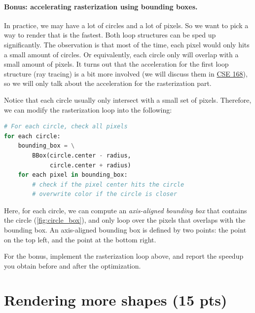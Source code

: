 \paragraph{Bonus: accelerating rasterization using bounding boxes.} In practice, we may have a lot of circles and a lot of pixels. So we want to pick a way to render that is the fastest. Both loop structures can be sped up significantly. The observation is that most of the time, each pixel would only hits a small amount of circles. Or equivalently, each circle only will overlap with a small amount of pixels. It turns out that the acceleration for the first loop structure (ray tracing) is a bit more involved (we will discuss them in \href{https://cseweb.ucsd.edu/~tzli/cse168}{CSE 168}), so we will only talk about the acceleration for the rasterization part.

Notice that each circle usually only intersect with a small set of pixels. Therefore, we can modify the rasterization loop into the following:
\begin{lstlisting}[language=Python]
# For each circle, check all pixels
for each circle:
    bounding_box = \
        BBox(circle.center - radius,
             circle.center + radius)
    for each pixel in bounding_box:
        # check if the pixel center hits the circle
        # overwrite color if the circle is closer
\end{lstlisting}
Here, for each circle, we can compute an \emph{axis-aligned bounding box} that contains the circle (\cref{fig:circle_box}), and only loop over the pixels that overlaps with the bounding box. An axis-aligned bounding box is defined by two points: the point on the top left, and the point at the bottom right. 

For the bonus, implement the rasterization loop above, and report the speedup you obtain before and after the optimization.

\section{Rendering more shapes (15 pts)}

